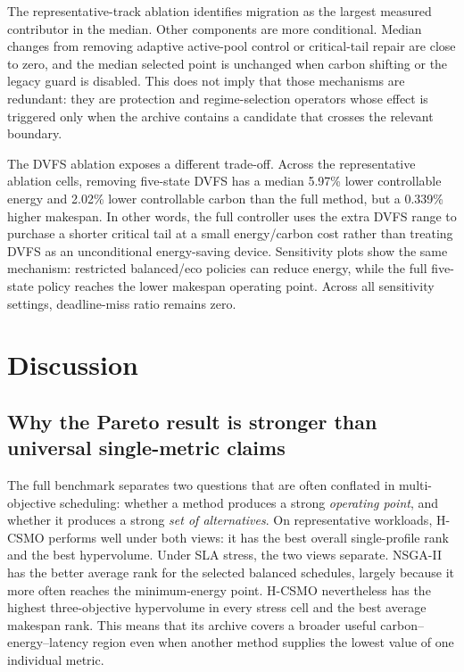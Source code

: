 \documentclass[preprint,12pt]{elsarticle}
\newcommand{\method}{H-CSMO\xspace}
\begin{document}
The representative-track ablation identifies migration as the largest measured contributor in the median. Other components are more conditional. Median changes from removing adaptive active-pool control or critical-tail repair are close to zero, and the median selected point is unchanged when carbon shifting or the legacy guard is disabled. This does not imply that those mechanisms are redundant: they are protection and regime-selection operators whose effect is triggered only when the archive contains a candidate that crosses the relevant boundary.

The DVFS ablation exposes a different trade-off. Across the representative ablation cells, removing five-state DVFS has a median 5.97\% lower controllable energy and 2.02\% lower controllable carbon than the full method, but a 0.339\% higher makespan. In other words, the full controller uses the extra DVFS range to purchase a shorter critical tail at a small energy/carbon cost rather than treating DVFS as an unconditional energy-saving device. Sensitivity plots show the same mechanism: restricted balanced/eco policies can reduce energy, while the full five-state policy reaches the lower makespan operating point. Across all sensitivity settings, deadline-miss ratio remains zero.
\section{Discussion}
\label{sec:discussion}

\subsection{Why the Pareto result is stronger than universal single-metric claims}

The full benchmark separates two questions that are often conflated in multi-objective scheduling: whether a method produces a strong \emph{operating point}, and whether it produces a strong \emph{set of alternatives}. On representative workloads, \method performs well under both views: it has the best overall single-profile rank and the best hypervolume. Under SLA stress, the two views separate. NSGA-II has the better average rank for the selected balanced schedules, largely because it more often reaches the minimum-energy point. \method nevertheless has the highest three-objective hypervolume in every stress cell and the best average makespan rank. This means that its archive covers a broader useful carbon--energy--latency region even when another method supplies the lowest value of one individual metric.
\end{document}
